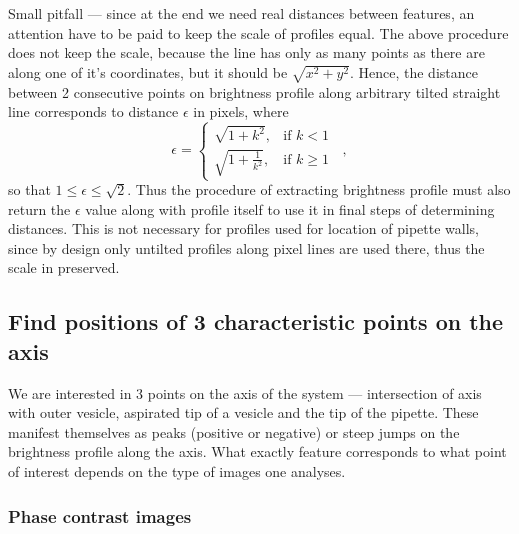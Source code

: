 Small pitfall --- since at the end we need real distances between features, an attention have to be paid to keep the scale of profiles equal. The above procedure does not keep the scale, because the line has only as many points as there are along one of it's coordinates, but it should be $\sqrt{x^2+y^2}$. Hence, the distance between 2 consecutive points on brightness profile along arbitrary tilted straight line corresponds to distance $\epsilon$ in pixels, where
\begin{equation}
\epsilon = \left\{
\begin{array}{ll}
	\sqrt{1+k^2},&\text{if }k < 1\\
	\sqrt{1+\frac{1}{k^2}},&\text{if } k \geq 1 
\end{array}
\right.\;\;,
\label{eq:profilescale}
\end{equation}
so that $1 \leq \epsilon \leq \sqrt{2}$. Thus the procedure of extracting brightness profile must also return the $\epsilon$ value along with profile itself to use it in final steps of determining distances. This is not necessary for profiles used for location of pipette walls, since by design only untilted profiles along pixel lines are used there, thus the scale in preserved.

\subsection{Find positions of 3 characteristic points on the axis}\label{points}

We are interested in 3 points on the axis of the system --- intersection of axis with outer vesicle, aspirated tip of a vesicle and the tip of the pipette. These manifest themselves as peaks (positive or negative) or steep jumps on the brightness profile along the axis. What exactly feature corresponds to what point of interest depends on the type of images one analyses.

\subsubsection{Phase contrast images}\label{phcfeatures}

